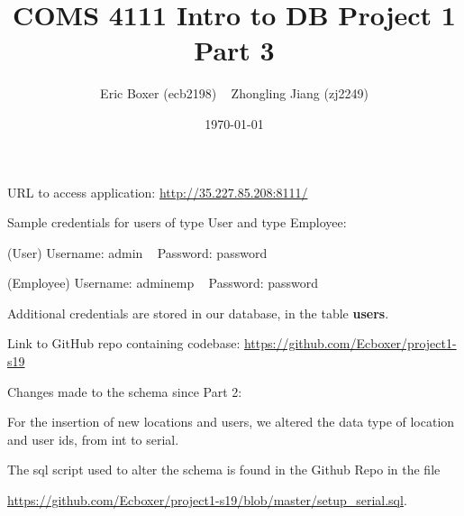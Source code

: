 \documentclass{article}
\title{COMS 4111 Intro to DB Project 1 Part 3}
\author{Eric Boxer (ecb2198) ~ Zhongling Jiang (zj2249)}
\date{\today}
\begin{document}
\maketitle{}

\noindent URL to access application: \href{http://35.227.85.208:8111/}{http://35.227.85.208:8111/}

\noindent Sample credentials for users of type User and type Employee:

(User) Username: admin ~ Password: password

(Employee) Username: adminemp ~ Password: password

Additional credentials are stored in our database, in the table \textbf{users}.

\bigskip

\noindent Link to GitHub repo containing codebase: \href{https://github.com/Ecboxer/project1-s19}{https://github.com/Ecboxer/project1-s19}

\bigskip

\noindent Changes made to the schema since Part 2:

\noindent For the insertion of new locations and users, we altered the data type of location and user ids, from int to serial.

\noindent The sql script used to alter the schema is found in the Github Repo in the file

\href{https://github.com/Ecboxer/project1-s19/blob/master/setup_serial.sql}{https://github.com/Ecboxer/project1-s19/blob/master/setup\_serial.sql}.
\end{document}
